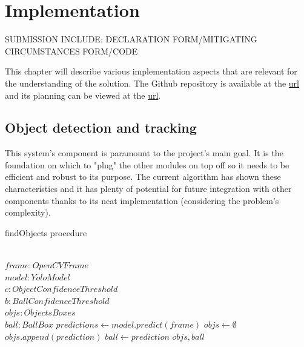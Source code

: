 \documentclass[
    11pt,
    oneside
]{report}
\begin{document}
\chapter{Implementation}




{\color{red}SUBMISSION INCLUDE: DECLARATION FORM/MITIGATING CIRCUMSTANCES FORM/CODE} \color

This chapter will describe various implementation aspects that are relevant for the understanding of the solution. The Github repository is available at the \href{https://github.com/xecarlox94/Computational-Imaging}{url} and its planning can be viewed at the \href{URL}{url}.







\section{Object detection and tracking}

This system's component is paramount to the project's main goal. It is the foundation on which to "plug" the other modules on top off so it needs to be efficient and robust to its purpose. The current algorithm has shown these characteristics and it has plenty of potential for future integration with other components thanks to its neat implementation (considering the problem's complexity).


\begin{algorithm}[H]
\begin{algorithmic}
\caption{findObjects procedure}\label{alg:findObjs}
\Require \\
    $frame: OpenCVFrame$ \\
    $model: YoloModel$ \\
    $c: ObjectConfidenceThreshold$ \\
    $b: BallConfidenceThreshold$
\Ensure \\
    $objs: ObjectsBoxes$ \\
    $ball: BallBox$
\State
\State $predictions \gets model.predict(frame)$
\State $objs \gets \emptyset$
        \State $objs.append(prediction)$
    \EndIf
        \State $ball \gets prediction$
    \EndIf
\EndFor
\State
\Return $objs, ball$
\end{algorithmic}
\end{algorithm}
\end{document}
